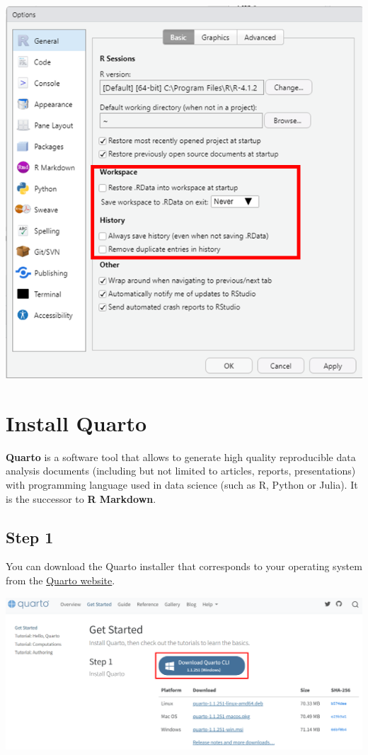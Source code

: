 \documentclass[
  letterpaper,
  DIV=11,
  numbers=noendperiod,
  oneside]{scrreprt}
\begin{document}
\includegraphics{images/paste-A507B21D.png}

\hypertarget{sec-Quarto-installation}{%
\section{Install Quarto}\label{sec-Quarto-installation}}

\textbf{Quarto} is a software tool that allows to generate high quality
reproducible data analysis documents (including but not limited to
articles, reports, presentations) with programming language used in data
science (such as R, Python or Julia). It is the successor to \textbf{R
Markdown}.

\subsection{Step 1}

You can download the Quarto installer that corresponds to your operating
system from the \href{https://quarto.org/docs/get-started/}{Quarto
website}.

\includegraphics{images/paste-DDD0332C.png}
\end{document}

